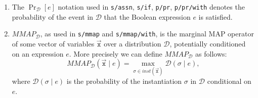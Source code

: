 \begin{enumerate}[leftmargin=*]
  \item The $\Pr_{\mathcal D}[e]$ notation used in
  \texttt{s/assn}, \texttt{s/if}, \texttt{p/pr}, \texttt{p/pr/with}
  denotes the probability of the event in $\mathcal D$ that the Boolean expression $e$ is satisfied.
  \item $MMAP_{\mathcal D}$, as used in \texttt{s/mmap} and \texttt{s/mmap/with},
  is the marginal MAP operator of some vector of variables $\vec{\mathtt{x}}$
  over a distribution $\mathcal D$, potentially conditioned on an expression $e$. More precisely we can define $MMAP_{\mathcal D}$ as follows:
  \begin{equation}
    MMAP_{\mathcal D}(\vec{\mathtt x} \mid e) = \max_{\sigma \in inst(\vec{\mathtt x})} \mathcal D(\sigma \mid e),
  \end{equation}
  where $\mathcal D(\sigma \mid e)$ is the probability of the instantiation $\sigma$ in $\mathcal D$ conditional on $e$.
\end{enumerate}




